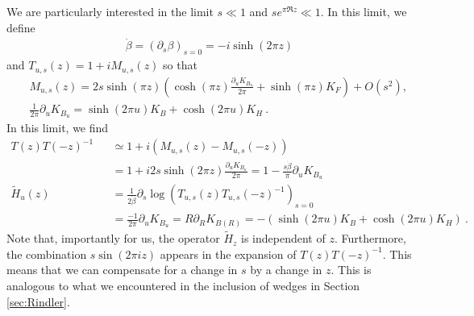 \documentclass[a4paper,11pt]{article}
\theoremstyle{definition}
\newcommand{\nn}{\nonumber}
\newcommand{\lb}{\left(}
\newcommand{\rb}{\right)}
\newcommand{\p}{\partial}
\begin{document}
We are particularly interested in the limit $s\ll 1$ and $s e^{\pi \Re z}\ll 1$. In this limit, we define 
\begin{eqnarray}
    \dot{\beta}=(\p_s \beta)_{s=0}=-i\sinh(2\pi z)
\end{eqnarray}
and $T_{u,s}(z)=1+i M_{u,s}(z)$ so that 
\begin{eqnarray}
    &&M_{u,s}(z)=2 s \sinh(\pi z)\lb \cosh(\pi z)\frac{\p_u K_{B_u}}{2\pi}+\sinh(\pi z)K_F\rb+O(s^2),\nn\\
    &&\frac{1}{2\pi}\p_u K_{B_u}=\sinh(2\pi u)K_B+\cosh(2\pi u) K_H\ .
\end{eqnarray}
In this limit, we find
\begin{eqnarray}
    T(z)T(-z)^{-1}&&\simeq 1+i(M_{u,s}(z)-M_{u,s}(-z))\nn\\
    &&=1 + i 2s \sinh(2\pi z)\frac{\p_u K_{B_u}}{2\pi}=1-\frac{s \dot{\beta}}{\pi}\p_u K_{B_u}\nn\\
    \tilde{H}_u(z)&&=\frac{1}{2\dot{\beta}}\p_s\log\lb T_{u,s}(z)T_{u,s}(-z)^{-1}\rb_{s=0}\nn\\
    &&=\frac{{-}1}{2\pi}\p_u K_{B_u}=R \p_R K_{B(R)}={-}(\sinh(2\pi u)K_B+\cosh(2\pi u)K_H)\nn\ .
\end{eqnarray}
Note that, importantly for us, the operator $\tilde{H}_z$ is independent of $z$. 
Furthermore, the combination $s \sin(2\pi i z)$ appears in the expansion of $T(z)T(-z)^{-1}$. This means that we can compensate for a change in $s$ by a change in $z$. This is analogous to what we encountered in the inclusion of wedges in Section \ref{sec:Rindler}. 
\end{document}
